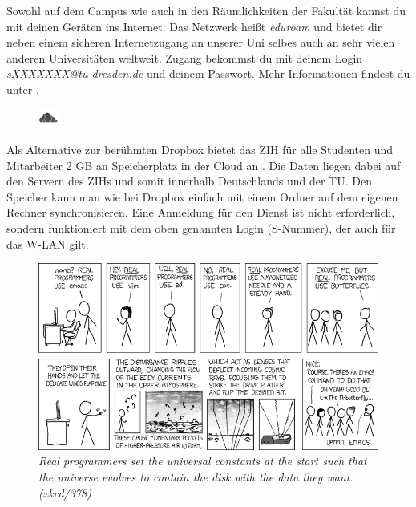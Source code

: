 Sowohl auf dem Campus wie auch in den Räumlichkeiten der Fakultät kannst du mit deinen Geräten ins Internet.
Das Netzwerk heißt \textit{eduroam} und bietet dir neben einem sicheren Internetzugang an unserer Uni selbes auch an sehr vielen anderen Universitäten weltweit. 
Zugang bekommst du mit deinem Login \textit{sXXXXXXX@tu-dresden.de} und deinem Passwort. Mehr Informationen findest du unter .


\begin{figure}
  \vspace{-14pt}
  \begin{centering}
    \includegraphics[width=0.06\textwidth]{img/icons/owncloud.png}
  \end{centering}
  \vspace{-20pt}
\end{figure}

Als Alternative zur berühmten Dropbox bietet das ZIH für alle Studenten und Mitarbeiter 2 GB an Speicherplatz in der Cloud an . Die Daten liegen dabei auf den Servern des ZIHs und somit innerhalb Deutschlands und der TU. Den Speicher kann man wie bei Dropbox einfach mit einem Ordner auf dem eigenen Rechner synchronisieren. Eine Anmeldung für den Dienst ist nicht erforderlich, sondern funktioniert mit dem oben genannten Login (S-Nummer), der auch für das W-LAN gilt.

\begin{figure}[h!]
\centering \includegraphics[width=\linewidth]{img/xkcd/real_programmers.png}
\caption*{{\small \textit{Real programmers set the universal constants at the start such that the universe evolves to contain the disk with the data they want. (xkcd/378)}}}
\end{figure}
